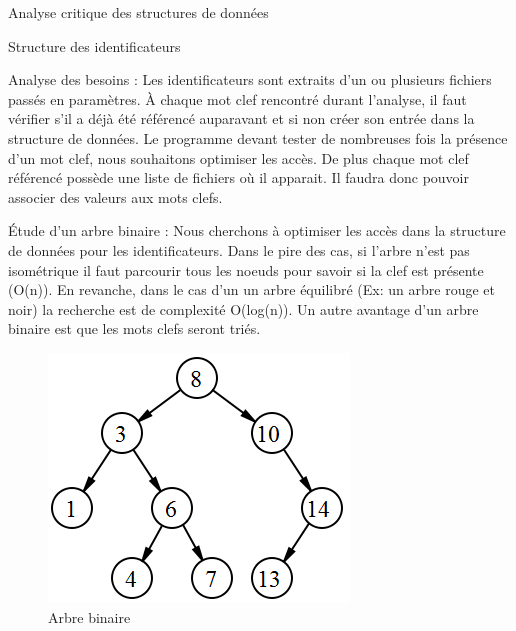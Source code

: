 \documentclass{article}
\begin{document}
\begin{section}{Analyse critique des structures de données}


  \begin{subsection}{Structure des identificateurs}
    \begin {paragraph}{Analyse des besoins :}
    Les identificateurs sont extraits d'un ou plusieurs fichiers passés en paramètres. À chaque mot clef rencontré durant l'analyse,
    il faut vérifier s'il a déjà été référencé auparavant et si non créer son entrée dans la structure de données. Le programme devant
    tester de nombreuses fois la présence d'un mot clef, nous souhaitons optimiser les accès. De plus chaque mot clef référencé 
    possède une liste de fichiers où il apparait. Il faudra donc pouvoir associer des valeurs aux mots clefs.
    \end{paragraph}
    
    \begin{paragraph}{Étude d'un arbre binaire :}
     Nous cherchons à optimiser les accès dans la structure de données pour les identificateurs. Dans le pire des cas, si l'arbre
     n'est pas isométrique il faut parcourir tous les noeuds pour savoir si la clef est présente (O(n)). En revanche, dans le cas d'un 
     un arbre équilibré (Ex: un arbre rouge et noir) la recherche est de complexité O(log(n)).
     Un autre avantage d'un arbre binaire est que les mots clefs seront triés.
     
    \begin{figure}[htp]
    \centering
    \includegraphics[scale=0.5]{images/arbre.png}
    \caption{Arbre binaire}
    \end{figure}


\end{paragraph}
\end{subsection}
\end{section}
\end{document}
